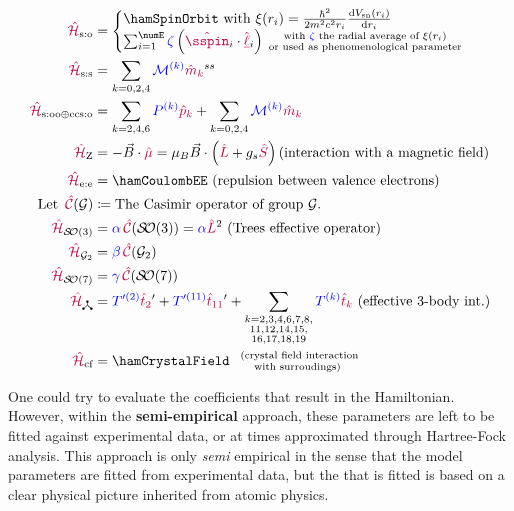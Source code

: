 \documentclass[11pt, twoside,openright]{article}
\begin{document}
\begin{mdframed}
\begin{align}
	\hamSpinOrbitSymbol &= \begin{cases} 
			\hamSpinOrbit \text{ with } \xi{(r_i)} = \frac{\hbar^2}{2 m^2 c^2 r_i} \frac{\diff{V_\text{sn}(r_i)}}{\diff{r_i}} \\
			\sum_{i=1}^\numE \spinZeta \paren{\op{\sspin}_i \cdot \op{\lorb}_i} {{\substack{
						\text{ with $\spinZeta$ the radial average of $\xi(r_i)$} \\ 
						\text{ or used as phenomenological parameter}  
						}
					}}    
			\end{cases} \\    
	\hamSpinSpinSymbol &= \hamSpinSpin \\  
	\hamSOOplusECSOSymbol &= \hamSOOplusECSO \\
    \hamZeemanSymbol &= -\vec{B} \cdot \op{\mu} = \hamZeeman \text{(interaction with a magnetic field)} \\
	\ham_\text{e:e} &= \hamCoulombEE \text{ (repulsion between valence electrons)} \\  
	\nonumber \text{Let } \casimir{\anyGroup} &\DEF \text{The Casimir operator of group $\anyGroup$.}\\ 
	\hamTreesSymbol &= \casimirAlpha\casimir{\SO{3}} = \casimirAlpha \op{L}^2 \text{ (Trees effective operator)} \\
	\hamGTwoSymbol      &= \casimirBeta\casimir{\Gtwo} \\
	\hamSOSevenSymbol   &= \casimirGamma\casimir{\SO{7}} \\
	\ham_{\trispoke} &= {\paramcolor{T'^{(2)}}} \tk{2}' + {\paramcolor{T'^{(11)}}} \tk{11}' + \hamEffectiveThreeBody \text{ (effective 3-body int.)} \\
	\hamCrystalFieldSymbol &= \hamCrystalField \,\,\, {   
		\substack{
			\text{ (crystal field interaction} \\
			\text{with surroudings)}
			} 
			}
\end{align}  
\end{mdframed}

One could try to evaluate the coefficients that result in the Hamiltonian. However, within the  \textbf{semi-empirical} approach, these parameters are left to be fitted against experimental data, or at times approximated through Hartree-Fock analysis. This approach is only \textit{semi} empirical in the sense that the model parameters are fitted from experimental data, but the \hamilton that is fitted is based on a clear physical picture inherited from atomic physics.
\end{document}
